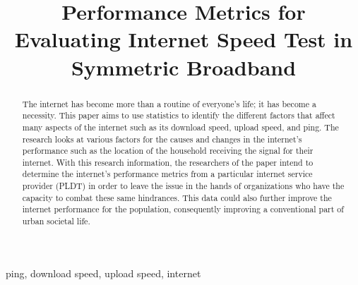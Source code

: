 \documentclass[conference]{IEEEtran}
\begin{document}
\title{Performance Metrics for Evaluating Internet Speed Test in Symmetric Broadband\\
}

\author{
\and
{}
}

\maketitle

\begin{abstract}
	The internet has become more than a routine of everyone's life; 
    it has become a necessity. This paper aims to use statistics to identify the different factors that affect many aspects of the internet such as its download speed, upload speed, and ping. 
    The research looks at various factors for the causes and changes in the internet's performance such as the location of the household receiving the signal for their internet. 
    With this research information, the researchers of the paper intend to determine the internet's performance metrics from a particular internet service provider (PLDT) in order to leave the issue in the hands of organizations who have the capacity to combat these same hindrances. 
    This data could also further improve the internet performance for the population, consequently improving a conventional part of urban societal life.
\end{abstract}

\begin{IEEEkeywords}
ping, download speed, upload speed, internet
\end{IEEEkeywords}
\end{document}
